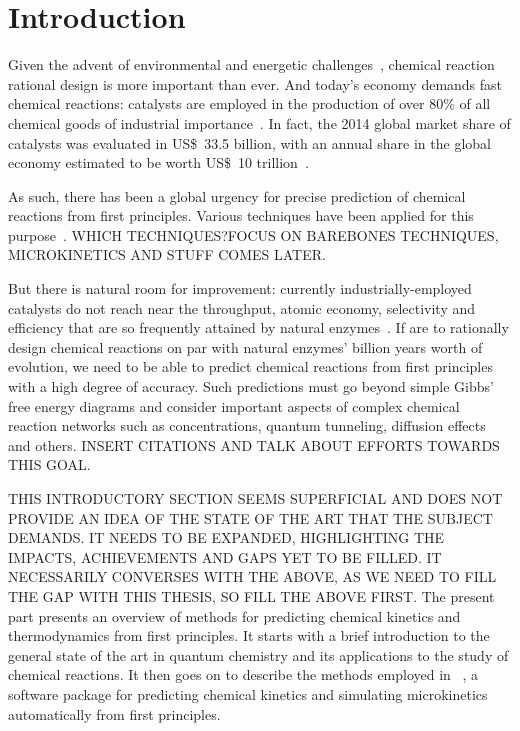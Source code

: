 \chapter{Introduction}%
\label{ch:introduction}

Given the advent of environmental and energetic challenges~\cite{Bertozzi_2016},
chemical reaction rational design is more important than ever.
And today's economy demands fast chemical reactions:
catalysts are employed in the production of over 80\% of all chemical
goods of industrial
importance~\cite{Breakthrough_Catalyst,GlobalCatalystMarket}.
In fact, the 2014 global market share of catalysts was evaluated in US\$~33.5 billion,
with an annual share in the global economy estimated to be worth US\$~10
trillion~\cite{GlobalCatalystMarket}.

As such, there has been a global urgency for precise prediction of chemical reactions from first principles.
Various techniques have been applied for this purpose~\cite{Cao2022}.
WHICH TECHNIQUES?\@ FOCUS ON BAREBONES TECHNIQUES, MICROKINETICS AND STUFF COMES LATER.\@

But there is natural room for improvement:
currently industrially-employed catalysts do
not reach near the throughput, atomic economy, selectivity and efficiency that
are so frequently attained by natural
enzymes~\cite{Catalysis_in_Chemistry_and_Enzymology}.
If are to rationally design chemical reactions on par with natural enzymes' billion years worth of evolution,
we need to be able to predict chemical reactions from first principles with a
high degree of accuracy.
Such predictions must go beyond simple Gibbs' free energy
diagrams and consider important aspects of complex chemical reaction networks
such as concentrations, quantum tunneling, diffusion effects and others.
INSERT CITATIONS AND TALK ABOUT EFFORTS TOWARDS THIS GOAL.\@

THIS INTRODUCTORY SECTION SEEMS SUPERFICIAL AND DOES NOT PROVIDE AN IDEA OF THE
STATE OF THE ART THAT THE SUBJECT DEMANDS.\@
IT NEEDS TO BE EXPANDED, HIGHLIGHTING THE IMPACTS, ACHIEVEMENTS AND GAPS YET TO
BE FILLED.\@
IT NECESSARILY CONVERSES WITH THE ABOVE, AS WE NEED TO FILL THE GAP WITH THIS THESIS,
SO FILL THE ABOVE FIRST.\@
The present part presents an overview of methods for predicting chemical
kinetics and thermodynamics from first principles.
It starts with a brief introduction to the general state of the art in quantum
chemistry and its applications to the study of chemical reactions.
It then goes on to describe the methods employed in
\overreact~\cite{Schneider2022}, a software
package for predicting chemical kinetics and simulating microkinetics
automatically from first principles.
